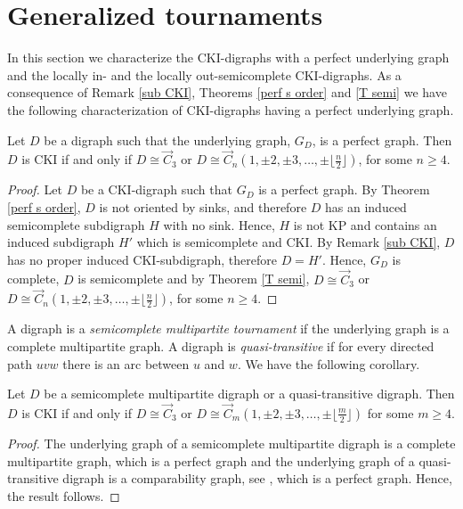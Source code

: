\section{Generalized tournaments}

In this section we characterize the CKI-digraphs with a perfect underlying graph and the locally in- and the locally out-semicomplete CKI-digraphs.
%
As a consequence of Remark \ref{sub CKI}, Theorems \ref{perf s order} and  \ref{T semi} we have the following characterization of CKI-digraphs having a perfect underlying graph.
%
\begin{teo}\label{*}
Let $D$ be a digraph such that the underlying graph, $G_D$, is a perfect graph. Then $D$ is CKI if and only if $D\cong \overrightarrow{C}_3$ or $D\cong \overrightarrow{C}_n(1,\pm2,\pm3,\dots,\pm\lfloor \frac{n}{2}\rfloor)$, for some $n\ge4$.
\end{teo}

\begin{proof}
Let $D$ be a CKI-digraph such that $G_D$ is a perfect graph. By Theorem \ref{perf s order}, $D$ is not oriented by sinks, and therefore $D$ has an induced semicomplete subdigraph $H$ with no sink. Hence, $H$ is not KP and contains an induced subdigraph $H'$ which is semicomplete and CKI. By Remark \ref{sub CKI}, $D$ has no proper induced CKI-subdigraph, therefore $D=H'$. Hence, $G_D$ is complete,  $D$ is semicomplete and by Theorem \ref{T semi}, $D\cong \overrightarrow{C}_3$ or $D\cong \overrightarrow{C}_n(1,\pm2,\pm3,\dots,\pm\lfloor \frac{n}{2}\rfloor)$, for some $n\ge4$.
\end{proof}

A digraph is a \emph{semicomplete multipartite tournament} if the underlying graph is a complete multipartite graph. A digraph is \emph{quasi-transitive} if for every directed path $uvw$ there is an arc between $u$ and $w$.  We have the following corollary.

\begin{coro}\label{C semi quasi}
Let $D$ be a semicomplete multipartite digraph or a quasi-transitive digraph. Then $D$ is  CKI if and only if  $D\cong \overrightarrow{C}_3$ or
$D\cong\overrightarrow{C}_{m}(1,\pm 2,\pm 3,\dots,\pm \lfloor \frac{m}{2} \rfloor )$ for some $m\ge4$.
\end{coro}

\begin{proof}
The underlying graph of a semicomplete multipartite digraph is a complete multipartite graph, which is a perfect graph  and
the underlying graph of a quasi-transitive digraph is a comparability graph, see  \cite{duchet1984introduction}, which is a perfect graph.
Hence, the result follows.
\end{proof}


